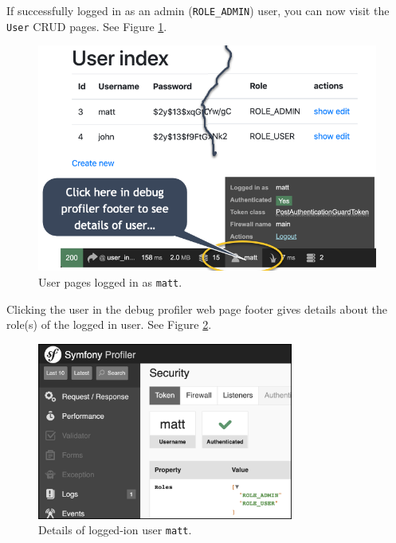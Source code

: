 \documentclass[a4paperpaper,openright]{book}
\begin{document}
If successfully logged in as an admin (\texttt{ROLE\_ADMIN}) user, you
can now visit the \texttt{User} CRUD pages. See Figure \ref{user_matt}.

\begin{figure}
\centering
\includegraphics[width=1\textwidth,height=\textheight]{./tex2pdf.-b567767c1af560fd/84cffeb13f942d54d447415ae700cc1724cc61f3.png}
\caption{User pages logged in as \texttt{matt}. \label{user_matt}}
\end{figure}

Clicking the user in the debug profiler web page footer gives details
about the role(s) of the logged in user. See Figure
\ref{user_matt_details}.

\begin{figure}
\centering
\includegraphics[width=0.75\textwidth,height=\textheight]{./tex2pdf.-b567767c1af560fd/728fb69456089104f63c0b8969fefd76c8ebde21.png}
\caption{Details of logged-ion user \texttt{matt}.
\label{user_matt_details}}
\end{figure}
\end{document}
